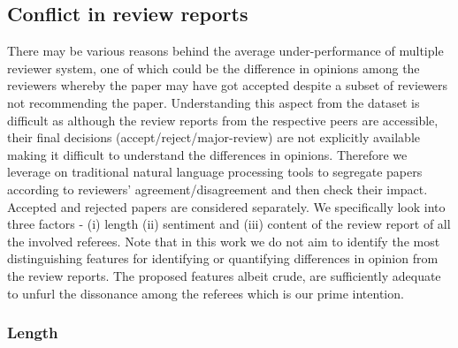 \subsection{Conflict in review reports}
There may be various reasons behind the average under-performance of multiple reviewer system, 
one of which could be the difference in opinions among the reviewers whereby the paper may have got accepted despite 
a subset of  reviewers  not recommending the paper.
Understanding this aspect from the dataset is difficult as 
although the review reports from the respective peers are accessible, their final decisions (accept/reject/major-review) are 
not explicitly available making it difficult to understand the differences in opinions. 
Therefore we leverage on traditional natural language processing tools 
to segregate papers according to reviewers' agreement/disagreement and then check their impact. Accepted and rejected papers are considered separately.
We specifically look into three factors - (i) length (ii) sentiment and (iii) content of the review report of all the involved referees. Note that 
in this work we do not aim to identify the most distinguishing features for identifying or 
quantifying differences in opinion from the review reports. The proposed features albeit crude, are sufficiently adequate to unfurl the 
dissonance among the referees which is our 
prime intention.


\subsubsection{Length}

